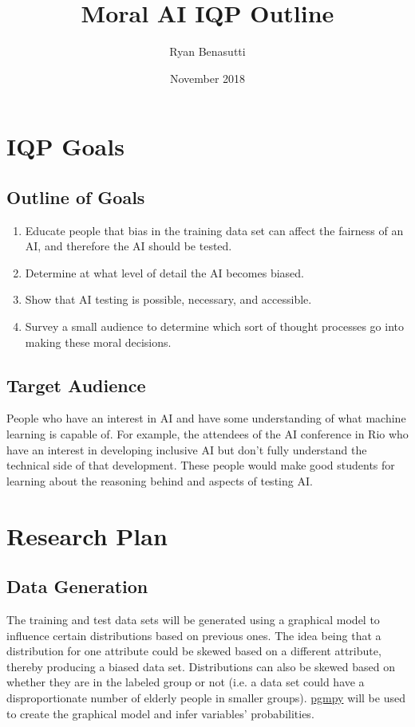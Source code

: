 \documentclass{article}
\title{Moral AI IQP Outline}
\author{Ryan Benasutti}
\date{November 2018}
\begin{document}
\maketitle

\section{IQP Goals}

\subsection{Outline of Goals}

\begin{enumerate}
    \item Educate people that bias in the training data set can affect the fairness of an AI, and therefore the AI should be tested.
    \item Determine at what level of detail the AI becomes biased.
    \item Show that AI testing is possible, necessary, and accessible.
    \item Survey a small audience to determine which sort of thought processes go into making these moral decisions.
\end{enumerate}

\subsection{Target Audience}

People who have an interest in AI and have some understanding of what machine learning is capable of. For example, the attendees of the AI conference in Rio who have an interest in developing inclusive AI but don't fully understand the technical side of that development. These people would make good students for learning about the reasoning behind and aspects of testing AI.

\section{Research Plan}

\subsection{Data Generation}

The training and test data sets will be generated using a graphical model to influence certain distributions based on previous ones. The idea being that a distribution for one attribute could be skewed based on a different attribute, thereby producing a biased data set. Distributions can also be skewed based on whether they are in the labeled group or not (i.e. a data set could have a disproportionate number of elderly people in smaller groups). \href{https://github.com/pgmpy/pgmpy}{pgmpy} will be used to create the graphical model and infer variables' probabilities.
\end{document}
